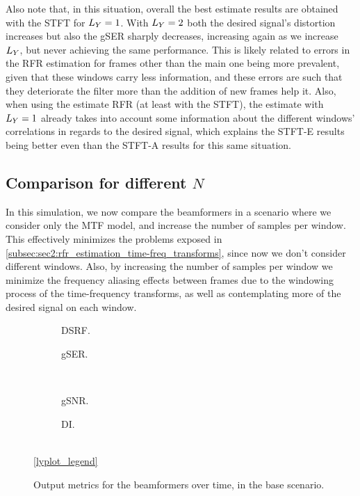 Also note that, in this situation, overall the best estimate results are obtained with the STFT for $\Ly = 1$. With $\Ly = 2$ both the desired signal's distortion increases but also the gSER sharply decreases, increasing again as we increase $\Ly$, but never achieving the same performance. This is likely related to errors in the RFR estimation for frames other than the main one being more prevalent, given that these windows carry less information, and these errors are such that they deteriorate the filter more than the addition of new frames help it. Also, when using the estimate RFR (at least with the STFT), the estimate with $\Ly = 1$ already takes into account some information about the different windows' correlations in regards to the desired signal, which explains the STFT-E results being better even than the STFT-A results for this same situation.


\subsection{Comparison for different $N$}

In this simulation, we now compare the beamformers in a scenario where we consider only the MTF model, and increase the number of samples per window. This effectively minimizes the problems exposed in \cref{subsec:sec2:rfr_estimation_time-freq_transforms}, since now we don't consider different windows. Also, by increasing the number of samples per window we minimize the frequency aliasing effects between frames due to the windowing process of the time-frequency transforms, as well as contemplating more of the desired signal on each window.
\begin{figure}[!ht]
	\centering
	\begin{subfigure}{0.49\textwidth}
		\centering
		
		\caption{DSRF.}
		\label{subfig:lineplot__DSRF__N_var__iSER_n15__Ly_1}
	\end{subfigure}\hfill
	\begin{subfigure}{0.49\textwidth}
		\centering
		
		\caption{gSER.}
		\label{subfig:lineplot__gSER__N_var__iSER_n15__Ly_1}
	\end{subfigure}\\[1em]
	\begin{subfigure}{0.49\textwidth}
		\centering
		
		\caption{gSNR.}
		\label{subfig:lineplot__gSNR__N_var__iSER_n15__Ly_1}
	\end{subfigure}\hfill
	\begin{subfigure}{0.49\textwidth}
		\centering
		
		\caption{DI.}
		\label{subfig:lineplot__DI__N_var__iSER_n15__Ly_1}
	\end{subfigure}\\[1em]
	\ref*{lyplot_legend}
	\caption{Output metrics for the beamformers over time, in the base scenario.}
	\label{fig:lineplot__N_var__iSER_n15__Ly_1}
\end{figure}

